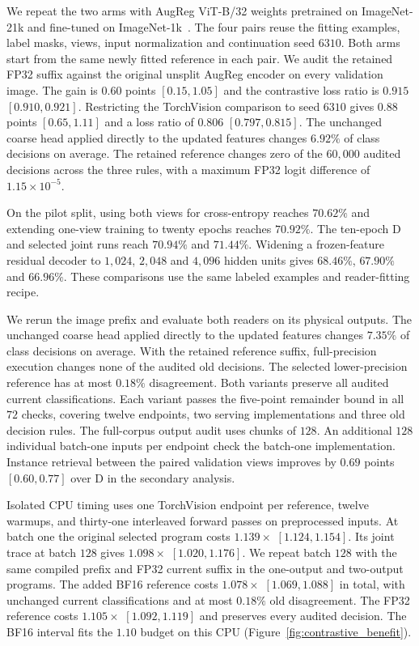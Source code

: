We repeat the two arms with AugReg ViT-B/32 weights pretrained on
ImageNet-21k and fine-tuned on ImageNet-1k~\citep{steiner2022augreg}.
The four pairs reuse the fitting examples, label masks, views, input
normalization and continuation seed $6310$. Both arms start from the same
newly fitted reference in each pair. We audit the retained FP32 suffix
against the original unsplit AugReg encoder on every validation image.
The gain is $0.60$ points $[0.15,1.05]$ and the contrastive loss ratio is
$0.915$ $[0.910,0.921]$. Restricting the TorchVision comparison to seed
$6310$ gives $0.88$ points $[0.65,1.11]$ and a loss ratio of $0.806$
$[0.797,0.815]$. The unchanged coarse head applied directly to
the updated features changes $6.92\%$ of class decisions on average.
The retained reference changes zero of the $60{,}000$ audited decisions
across the three rules, with a maximum FP32 logit difference of
$1.15\times10^{-5}$.

On the pilot split, using both views for cross-entropy reaches $70.62\%$
and extending one-view training to twenty epochs reaches $70.92\%$.
The ten-epoch D and selected joint runs reach $70.94\%$ and $71.44\%$.
Widening a frozen-feature residual decoder to $1{,}024$, $2{,}048$ and
$4{,}096$ hidden units gives $68.46\%$, $67.90\%$ and $66.96\%$.
These comparisons use the same labeled examples and reader-fitting recipe.

We rerun the image prefix and evaluate both readers on its physical outputs.
The unchanged coarse head applied directly to the updated features changes
$7.35\%$ of class decisions on average. With the retained reference suffix,
full-precision execution changes none of the audited old decisions.
The selected lower-precision reference has at most $0.18\%$ disagreement.
Both variants preserve all audited current classifications. Each variant
passes the five-point remainder bound in all $72$ checks, covering twelve
endpoints, two serving implementations and three old decision rules.
The full-corpus output audit uses chunks of $128$. An additional $128$
individual batch-one inputs per endpoint check the batch-one implementation.
Instance retrieval between the paired validation views improves by
$0.69$ points $[0.60,0.77]$ over D in the secondary analysis.

Isolated CPU timing uses one TorchVision endpoint per reference, twelve
warmups, and thirty-one interleaved forward passes on preprocessed inputs.
At batch one the original selected program costs $1.139\times$
$[1.124,1.154]$. Its joint trace at batch $128$ gives $1.098\times$
$[1.020,1.176]$. We repeat batch $128$ with the same compiled prefix and
FP32 current suffix in the one-output and two-output programs. The added
BF16 reference costs $1.078\times$ $[1.069,1.088]$ in total, with unchanged
current classifications and at most $0.18\%$ old disagreement. The FP32
reference costs $1.105\times$ $[1.092,1.119]$ and preserves every audited
decision. The BF16 interval fits the $1.10$ budget on this CPU
(Figure~\ref{fig:contrastive_benefit}).


